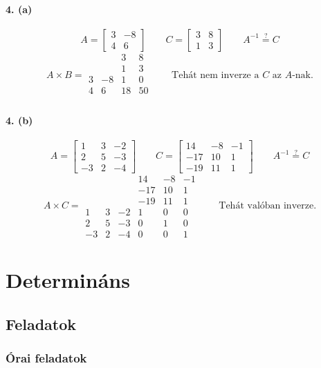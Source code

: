 \documentclass[12pt,a4paper,fleqn]{article}
\newcommand{\myparagraph}[1]{\paragraph{#1}\mbox{}}
\begin{document}
\myparagraph{4. (a)}
\[
  A = \begin{bmatrix} 3 & -8 \\ 4 & 6 \end{bmatrix} \qquad
  C = \begin{bmatrix} 3 & 8 \\ 1 & 3 \end{bmatrix} \qquad
  A^{-1} \stackrel{?}{=} C
\]
\[
  A \times B =
  \begin{array}{cc|cc}
     &    &  3 &  8 \\
     &    &  1 &  3 \\ \hline
   3 & -8 &  1 &  0 \\
   4 &  6 & 18 & 50 \\
  \end{array}
  \qquad
  \text{Tehát nem inverze a $C$ az $A$-nak.}
\]

\myparagraph{4. (b)}
\[
  A =
  \begin{bmatrix}
    1 & 3 & -2 \\
    2 & 5 & -3 \\
    -3 & 2 & -4
  \end{bmatrix}
  \qquad
  C =
  \begin{bmatrix}
    14 & -8 & -1 \\
    -17 & 10 & 1 \\
    -19 & 11 & 1
  \end{bmatrix}
  \qquad
  A^{-1} \stackrel{?}{=} C
\]
\[
  A \times C =
  \begin{array}{ccc|ccc}
      &   &    & 14  & -8 & -1 \\
      &   &    & -17 & 10 & 1 \\
      &   &    & -19 & 11 & 1 \\ \hline
   1  & 3 & -2 & 1   & 0 & 0 \\
   2  & 5 & -3 & 0   & 1 & 0 \\
   -3 & 2 & -4 & 0   & 0 & 1
  \end{array}
  \qquad \text{Tehát valóban inverze.}
\]


\clearpage
\section{Determináns}
\setcounter{subsection}{1}
\subsection{Feladatok}
\subsubsection{Órai feladatok}
\end{document}
